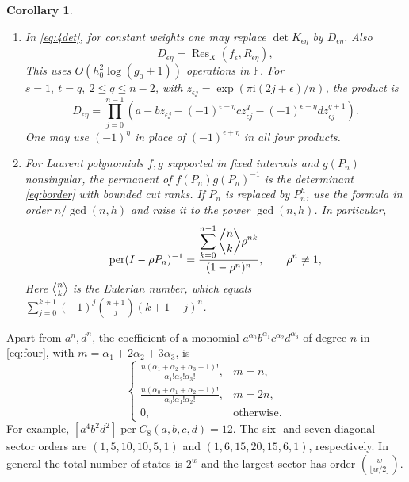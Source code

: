 \documentclass[11pt,reqno]{amsart}
\newtheorem{corollary}[theorem]{Corollary}
\theoremstyle{remark}
\numberwithin{equation}{section}
\newcommand{\per}{\operatorname{per}}
\newcommand{\F}{\mathbb F}
\newcommand{\eul}[2]{\genfrac{\langle}{\rangle}{0pt}{}{#1}{#2}}
\begin{document}
\begin{corollary}
\begin{enumerate}
\item In \eqref{eq:4det}, for constant weights one may replace
\(\det K_{\epsilon\eta}\) by \(D_{\epsilon\eta}\). Also
\begin{equation}\label{eq:resultant}
 D_{\epsilon\eta}=\operatorname{Res}_X(f_\epsilon,R_{\epsilon\eta}),
\end{equation}
This uses \(O(h_0^2\log(g_0+1))\) operations in \(\F\).
For \(s=1,\ t=q,\ 2\le q\le n-2\), with
\(z_{\epsilon j}=\exp(\pi\mathrm i(2j+\epsilon)/n)\), the product is
\[
 D_{\epsilon\eta}=\prod_{j=0}^{n-1}
   (a-bz_{\epsilon j}-(-1)^{\epsilon+\eta}c z_{\epsilon j}^{q}
                     -(-1)^{\epsilon+\eta}d z_{\epsilon j}^{q+1}).
\]
One may use \((-1)^\eta\) in place of \((-1)^{\epsilon+\eta}\)
in all four products.

\item For Laurent polynomials \(f,g\) supported in fixed
intervals and \(g(P_n)\) nonsingular, the permanent of
\(f(P_n)g(P_n)^{-1}\) is the determinant \eqref{eq:border}
with bounded cut ranks. If \(P_n\) is replaced by \(P_n^h\),
use the formula in order \(n/\gcd(n,h)\) and raise it to the
power \(\gcd(n,h)\). In particular,
\begin{equation}\label{eq:eulerian}
 \per (I-\rho P_n)^{-1}
  =\frac{\displaystyle\sum_{k=0}^{n-1}
                  \eul{n}{k}\rho^{nk}}
         {(1-\rho^n)^n},\qquad \rho^n\ne1,
\end{equation}
Here \(\eul{n}{k}\) is the Eulerian number, which equals
\(\sum_{j=0}^{k+1}(-1)^j\binom{n+1}{j}(k+1-j)^n\).
\end{enumerate}
\end{corollary}

Apart from \(a^n,d^n\), the coefficient of a monomial
\(a^{\alpha_0}b^{\alpha_1}c^{\alpha_2}d^{\alpha_3}\) of degree \(n\)
in \eqref{eq:four}, with \(m=\alpha_1+2\alpha_2+3\alpha_3\), is
\[
 \begin{cases}
 \displaystyle\frac{n(\alpha_1+\alpha_2+\alpha_3-1)!}
                  {\alpha_1!\alpha_2!\alpha_3!},&m=n,\\[6pt]
 \displaystyle\frac{n(\alpha_0+\alpha_1+\alpha_2-1)!}
                  {\alpha_0!\alpha_1!\alpha_2!},&m=2n,\\[6pt]
 0,&\text{otherwise}.
 \end{cases}
\]
For example, \([a^4b^2d^2]\per C_8(a,b,c,d)=12\).
The six- and seven-diagonal sector orders are
\((1,5,10,10,5,1)\) and \((1,6,15,20,15,6,1)\), respectively.
In general the total number of states is \(2^w\) and the largest
sector has order \(\binom{w}{\lfloor w/2\rfloor}\).
\end{document}

